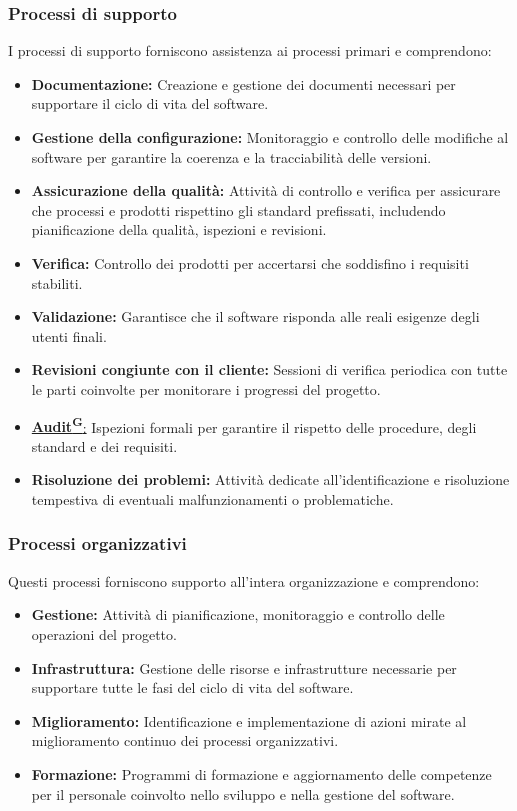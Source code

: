 \subsubsection{Processi di supporto}
I processi di supporto forniscono assistenza ai processi primari e comprendono:
\begin{itemize}
    \item \textbf{Documentazione:} Creazione e gestione dei documenti necessari per supportare il ciclo di vita del software.
    \item \textbf{Gestione della configurazione:} Monitoraggio e controllo delle modifiche al software per garantire la coerenza e la tracciabilità delle versioni.
    \item \textbf{Assicurazione della qualità:} Attività di controllo e verifica per assicurare che processi e prodotti rispettino gli standard prefissati, includendo pianificazione della qualità, ispezioni e revisioni.
    \item \textbf{Verifica:} Controllo dei prodotti per accertarsi che soddisfino i requisiti stabiliti.
    \item \textbf{Validazione:} Garantisce che il software risponda alle reali esigenze degli utenti finali.
    \item \textbf{Revisioni congiunte con il cliente:} Sessioni di verifica periodica con tutte le parti coinvolte per monitorare i progressi del progetto.
    \item \href{https://code7crusaders.github.io/docs/PB/documentazione_interna/glossario.html#audit}{\textbf{Audit\textsuperscript{G}}:} Ispezioni formali per garantire il rispetto delle procedure, degli standard e dei requisiti.
    \item \textbf{Risoluzione dei problemi:} Attività dedicate all'identificazione e risoluzione tempestiva di eventuali malfunzionamenti o problematiche.
\end{itemize}

\subsubsection{Processi organizzativi}
Questi processi forniscono supporto all’intera organizzazione e comprendono:
\begin{itemize}
    \item \textbf{Gestione:} Attività di pianificazione, monitoraggio e controllo delle operazioni del progetto.
    \item \textbf{Infrastruttura:} Gestione delle risorse e infrastrutture necessarie per supportare tutte le fasi del ciclo di vita del software.
    \item \textbf{Miglioramento:} Identificazione e implementazione di azioni mirate al miglioramento continuo dei processi organizzativi.
    \item \textbf{Formazione:} Programmi di formazione e aggiornamento delle competenze per il personale coinvolto nello sviluppo e nella gestione del software.
\end{itemize}
